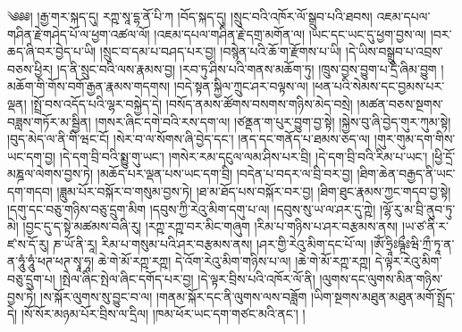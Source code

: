 ༄༅༅། །རྒྱ་གར་སྐད་དུ། རཀྵ་སཱ་དྷ་ནོ་པི་ཀ །བོད་སྐད་དུ། །སྲུང་བའི་འཁོར་ལོ་སྒྲུབ་པའི་ཐབས། འཇམ་དཔལ་གཤིན་རྗེ་གཤེད་པོ་ལ་ཕྱག་འཚལ་ལོ། །འཇམ་དཔལ་གཤིན་རྗེ་དགྲ་མགོན་ལ། །ཡང་དང་ཡང་དུ་ཕྱག་བྱས་ལ། །བར་ཆད་ཞི་བར་བྱེད་པ་ཡི། །སྲུང་བ་དམ་པ་བཤད་པར་བྱ། །བསྙེན་པའི་ཆོ་ག་རྫོགས་པ་ཡི། །དེ་ཡིས་བསྒྲུབ་པ་འབྲས་བཅས་ཕྱིར། །ད་ནི་སྲུང་བའི་ལས་རྣམས་བྱ། །རབ་ཏུ་ཤིས་པའི་གནས་མཆོག་ཏུ། །ཁྲུས་བྱས་བྱུག་པ་དྲི་ཞིམ་བྱུག །མཆོག་གི་གོས་བགོ་རྒྱན་རྣམས་གདགས། །བདེ་སྟན་སྐྱིལ་ཀྲུང་ཤར་བལྟས་ལ། །ཕན་པའི་སེམས་དང་བྱམས་པར་ལྡན། །སྤྲོ་བས་འདོད་པའི་ལྷར་བསྐྱེད་དེ། །བསོད་ནམས་ཚོགས་བསགས་གཉིས་མེད་བསྲེ། །མཚན་བཅས་སྔགས་བཟླས་གཏོར་མ་སྦྱིན། །གསར་ཞིང་དགེ་བའི་རས་དག་ལ། །ཙནྡན་ག་པུར་བྱུག་བྱ་སྟེ། །སྐྱེས་བུ་ཞི་བྱེད་གུར་ཀུམ་སྟེ། །བུད་མེད་ལ་ནི་གི་ཝང་ངོ། །སེར་བ་ལ་སོགས་ཞི་བྱེད་དང་། །ནད་དང་གནོད་པ་ཐམས་ཅད་ལ། །གུར་གུམ་དག་གིས་ཡང་དག་བྱ། །དེ་དག་བྲི་བའི་སྨྱུ་གུ་ཡང་། །གསེར་རམ་དངུལ་ལམ་ཤིས་པར་བྲི། །དེ་དག་བྲི་བའི་རིམ་པ་ཡང་། །ཕྱི་དྲོ་མཎྜལ་ལེགས་བྱས་ཏེ། །མཆོད་པར་ལྡན་པས་ཡང་དག་བྲི། །བདེན་པ་བདར་ལ་བྲི་བར་བྱ། །ཐིག་ཆེན་བརྒྱད་ནི་ཡང་དག་གདབ། །ཟླུམ་པོར་བསྐོར་བ་གསུམ་བྱས་ཏེ། །ཐ་མ་ཐོད་པས་བསྐོར་བར་བྱ། །ཐིག་ཐུང་རྣམས་ཀྱང་གདབ་བྱ་སྟེ། །དགུ་དང་བཅུ་གཉིས་བཅུ་དྲུག་མིག །དབུས་ཀྱི་རེའུ་མིག་དགུ་པ་ལ། །དབུས་སུ་ཡ་ལ་ཤར་དུ་ཀྵེ། །ལྷོ་རུ་མ་བྲི་ནུབ་ཏུ་མེ། །བྱང་དུ་ད་སྟེ་མཚམས་བཞི་རུ། །རཀྵ་རཀྵ་བར་མིང་གཞུག །རིམ་པ་གཉིས་པ་ཤར་བརྩམས་ནས། །ཡ་ཙ་ནི་ར་ཛ་ས་དོ་རུ། ཎ་ཡོ་ནི་རཱ། རིམ་པ་གསུམ་པའི་ཤར་བརྩམས་ནས། །ཤར་གྱི་རེའུ་མིག་དང་པོ་ལ། །ཨོཾ་ཧྲཱིཿཥྚྲྀཿཝི་ཀྲྀ་ཏཱ་ན་ན་ཧཱུཾ་ཧཱུཾ་ཕཊ་ཕཊ་སྭཱ་ཧཱ། ཆེ་གེ་མོ་རཀྵ་རཀྵ། དེ་འོག་རེའུ་མིག་གཉིས་པ་ལ། །ཆེ་གེ་མོ་རཀྵ་རཀྵ། དེ་ལྟར་རེའུ་མིག་བཅུ་དྲུག་པ། །སྤེལ་ཞིང་སྤེལ་ཞིང་དགོད་པར་བྱ། །དེ་ལྟར་བྲིས་པའི་འཁོར་ལོ་ནི། །ལུགས་དང་ལུགས་མིན་གཉིས་བྱས་ཏེ། །ས་སྐོར་ལུགས་སུ་བྱུང་བ་ལ། །གནམ་སྐོར་དང་ནི་ལུགས་ལས་བཟློག །ཡིག་སྔགས་མཐུན་མཐུན་མགོ་སྤྲོད་དེ། །སོ་སོར་མཉམ་པོར་བྲིས་ལ་དྲིལ། །ཁམ་ཕོར་ཡང་དག་གཙང་མའི་ནང་། །
